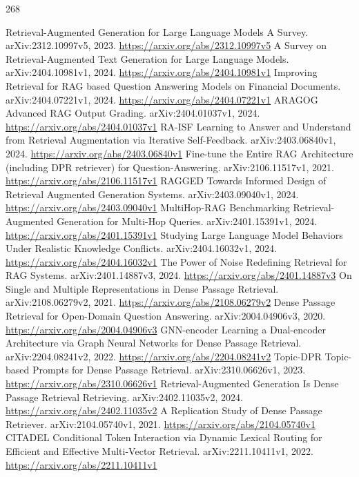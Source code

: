 \documentclass[11pt]{article}
\begin{document}
\begin{thebibliography}{268}
 Retrieval-Augmented Generation for Large Language Models A Survey. arXiv:2312.10997v5, 2023. \url{https://arxiv.org/abs/2312.10997v5}
 A Survey on Retrieval-Augmented Text Generation for Large Language Models. arXiv:2404.10981v1, 2024. \url{https://arxiv.org/abs/2404.10981v1}
 Improving Retrieval for RAG based Question Answering Models on Financial Documents. arXiv:2404.07221v1, 2024. \url{https://arxiv.org/abs/2404.07221v1}
 ARAGOG Advanced RAG Output Grading. arXiv:2404.01037v1, 2024. \url{https://arxiv.org/abs/2404.01037v1}
 RA-ISF Learning to Answer and Understand from Retrieval Augmentation via Iterative Self-Feedback. arXiv:2403.06840v1, 2024. \url{https://arxiv.org/abs/2403.06840v1}
 Fine-tune the Entire RAG Architecture (including DPR retriever) for Question-Answering. arXiv:2106.11517v1, 2021. \url{https://arxiv.org/abs/2106.11517v1}
 RAGGED Towards Informed Design of Retrieval Augmented Generation Systems. arXiv:2403.09040v1, 2024. \url{https://arxiv.org/abs/2403.09040v1}
 MultiHop-RAG Benchmarking Retrieval-Augmented Generation for Multi-Hop Queries. arXiv:2401.15391v1, 2024. \url{https://arxiv.org/abs/2401.15391v1}
 Studying Large Language Model Behaviors Under Realistic Knowledge Conflicts. arXiv:2404.16032v1, 2024. \url{https://arxiv.org/abs/2404.16032v1}
 The Power of Noise Redefining Retrieval for RAG Systems. arXiv:2401.14887v3, 2024. \url{https://arxiv.org/abs/2401.14887v3}
 On Single and Multiple Representations in Dense Passage Retrieval. arXiv:2108.06279v2, 2021. \url{https://arxiv.org/abs/2108.06279v2}
 Dense Passage Retrieval for Open-Domain Question Answering. arXiv:2004.04906v3, 2020. \url{https://arxiv.org/abs/2004.04906v3}
 GNN-encoder Learning a Dual-encoder Architecture via Graph Neural Networks for Dense Passage Retrieval. arXiv:2204.08241v2, 2022. \url{https://arxiv.org/abs/2204.08241v2}
 Topic-DPR Topic-based Prompts for Dense Passage Retrieval. arXiv:2310.06626v1, 2023. \url{https://arxiv.org/abs/2310.06626v1}
 Retrieval-Augmented Generation Is Dense Passage Retrieval Retrieving. arXiv:2402.11035v2, 2024. \url{https://arxiv.org/abs/2402.11035v2}
 A Replication Study of Dense Passage Retriever. arXiv:2104.05740v1, 2021. \url{https://arxiv.org/abs/2104.05740v1}
 CITADEL Conditional Token Interaction via Dynamic Lexical Routing for Efficient and Effective Multi-Vector Retrieval. arXiv:2211.10411v1, 2022. \url{https://arxiv.org/abs/2211.10411v1}

\end{thebibliography}
\end{document}
